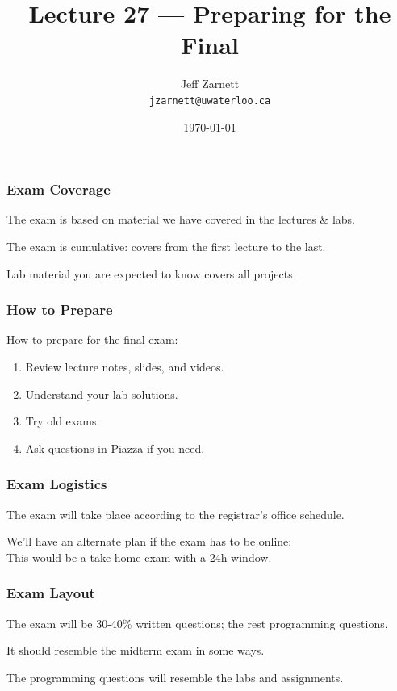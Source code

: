 

\title{Lecture 27 --- Preparing for the Final }

\author{Jeff Zarnett \\ \small \texttt{jzarnett@uwaterloo.ca}}
\date{\today}




\begin{frame}
  \titlepage

\end{frame}

\begin{frame}
\frametitle{Exam Coverage}

The exam is based on material we have covered in the lectures \& labs.

The exam is cumulative: covers from the first lecture to the last.

Lab material you are expected to know covers all projects

\end{frame}

\begin{frame}
\frametitle{How to Prepare}

How to prepare for the final exam:

\begin{enumerate}
	\item Review lecture notes, slides, and videos.
	\item Understand your lab solutions.
	\item Try old exams.
	\item Ask questions in Piazza if you need.
\end{enumerate}

\end{frame}


\begin{frame}
\frametitle{Exam Logistics}

The exam will take place according to the registrar's office schedule.

We'll have an alternate plan if the exam has to be online:\\
\quad This would be a take-home exam with a 24h window.

\end{frame}


\begin{frame}
\frametitle{Exam Layout}

The exam will be 30-40\% written questions; the rest programming questions.

It should resemble the midterm exam in some ways.

The programming questions will resemble the labs and assignments.

\end{frame}


